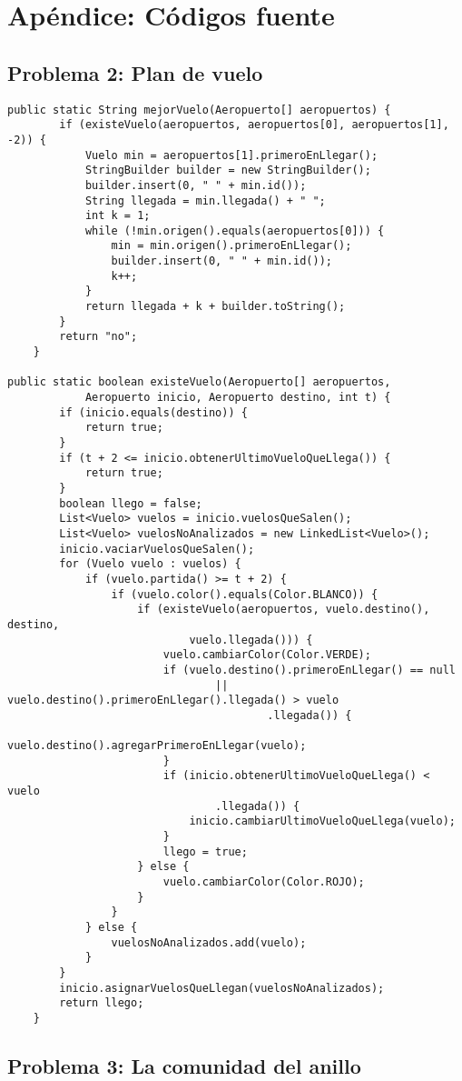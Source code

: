 \section{Apéndice: Códigos fuente}

\subsection{Problema 2: Plan de vuelo }
\begin{lstlisting}[frame=single]
public static String mejorVuelo(Aeropuerto[] aeropuertos) {
		if (existeVuelo(aeropuertos, aeropuertos[0], aeropuertos[1], -2)) {
			Vuelo min = aeropuertos[1].primeroEnLlegar();
			StringBuilder builder = new StringBuilder();
			builder.insert(0, " " + min.id());
			String llegada = min.llegada() + " ";
			int k = 1;
			while (!min.origen().equals(aeropuertos[0])) {
				min = min.origen().primeroEnLlegar();
				builder.insert(0, " " + min.id());
				k++;
			}
			return llegada + k + builder.toString();
		}
		return "no";
	}

public static boolean existeVuelo(Aeropuerto[] aeropuertos,
			Aeropuerto inicio, Aeropuerto destino, int t) {
		if (inicio.equals(destino)) {
			return true;
		}
		if (t + 2 <= inicio.obtenerUltimoVueloQueLlega()) {
			return true;
		}
		boolean llego = false;
		List<Vuelo> vuelos = inicio.vuelosQueSalen();
		List<Vuelo> vuelosNoAnalizados = new LinkedList<Vuelo>();
		inicio.vaciarVuelosQueSalen();
		for (Vuelo vuelo : vuelos) {
			if (vuelo.partida() >= t + 2) {
				if (vuelo.color().equals(Color.BLANCO)) {
					if (existeVuelo(aeropuertos, vuelo.destino(), destino,
							vuelo.llegada())) {
						vuelo.cambiarColor(Color.VERDE);
						if (vuelo.destino().primeroEnLlegar() == null
								|| vuelo.destino().primeroEnLlegar().llegada() > vuelo
										.llegada()) {
							vuelo.destino().agregarPrimeroEnLlegar(vuelo);
						}
						if (inicio.obtenerUltimoVueloQueLlega() < vuelo
								.llegada()) {
							inicio.cambiarUltimoVueloQueLlega(vuelo);
						}
						llego = true;
					} else {
						vuelo.cambiarColor(Color.ROJO);
					}
				}
			} else {
				vuelosNoAnalizados.add(vuelo);
			}
		}
		inicio.asignarVuelosQueLlegan(vuelosNoAnalizados);
		return llego;
	}

\end{lstlisting}
\subsection{Problema 3: La comunidad del anillo}
